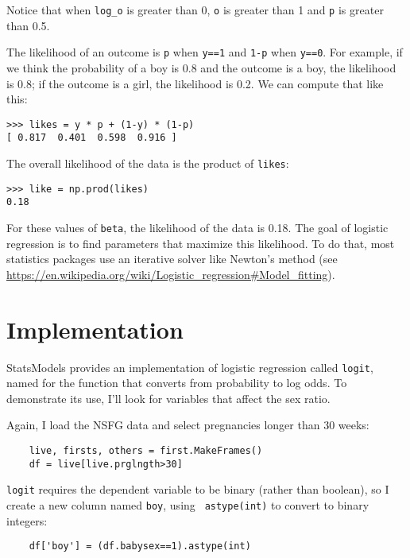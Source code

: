 Notice that when \verb"log_o" is greater than 0, {\tt o}
is greater than 1 and {\tt p} is greater than 0.5.

The likelihood of an outcome is {\tt p} when {\tt y==1} and {\tt 1-p}
when {\tt y==0}.  For example, if we think the probability of a boy is
0.8 and the outcome is a boy, the likelihood is 0.8; if
the outcome is a girl, the likelihood is 0.2.  We can compute that
like this:

\begin{verbatim}
>>> likes = y * p + (1-y) * (1-p)
[ 0.817  0.401  0.598  0.916 ]
\end{verbatim}

The overall likelihood of the data is the product of {\tt likes}:

\begin{verbatim}
>>> like = np.prod(likes)
0.18
\end{verbatim}

For these values of {\tt beta}, the likelihood of the data is 0.18.
The goal of logistic regression is to find parameters that maximize
this likelihood.  To do that, most statistics packages use an
iterative solver like Newton's method (see
\url{https://en.wikipedia.org/wiki/Logistic_regression#Model_fitting}).


\section{Implementation}
\label{implementation}

StatsModels provides an implementation of logistic regression
called {\tt logit}, named for the function that converts from
probability to log odds.  To demonstrate its use, I'll look for
variables that affect the sex ratio.

Again, I load the NSFG data and select pregnancies longer than
30 weeks:

\begin{verbatim}
    live, firsts, others = first.MakeFrames()
    df = live[live.prglngth>30]
\end{verbatim}

{\tt logit} requires the dependent variable to be binary (rather than
boolean), so I create a new column named {\tt boy}, using {\tt
  astype(int)} to convert to binary integers:

\begin{verbatim}
    df['boy'] = (df.babysex==1).astype(int)
\end{verbatim}

